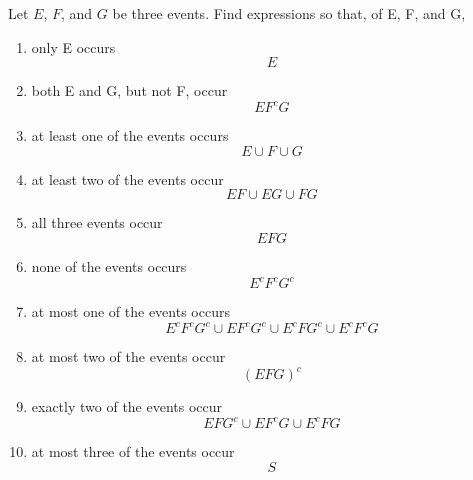 \item Let $E$, $F$, and $G$ be three events. Find expressions so that, of E, F, and G,
\begin{enumerate}
     \item only E occurs
     \[ E \]
     \item both E and G, but not F, occur
     \[ EF^cG \]
     \item at least one of the events occurs
     \[ E\cup F\cup G \]
     \item at least two of the events occur
     \[ EF\cup EG\cup FG \]
     \item all three events occur
     \[ EFG \]
     \item none of the events occurs
     \[ E^cF^cG^c \]
     \item at most one of the events occurs
     \[ E^cF^cG^c\cup EF^cG^c\cup E^cFG^c\cup E^cF^cG \]
     \item at most two of the events occur
     \[ (EFG)^c \]
     \item exactly two of the events occur
     \[ EFG^c\cup EF^cG\cup E^cFG \]
     \item at most three of the events occur
     \[ S \]
\end{enumerate}
